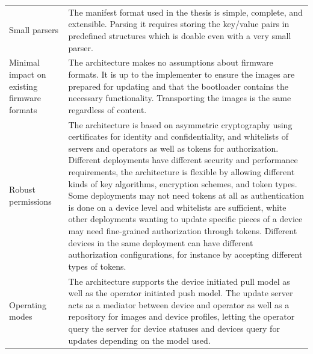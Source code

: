 \documentclass[0-thesis.tex]{subfiles}
\begin{document}
\begin{longtable}[]{@{}ll@{}}
\begin{minipage}[t]{0.41\columnwidth}
    Small parsers\strut
    \end{minipage} & \begin{minipage}[t]{0.53\columnwidth}\raggedright\strut
    The manifest format used in the thesis is simple, complete, and
    extensible. Parsing it requires storing the key/value pairs in
    predefined structures which is doable even with a very small
    parser.\strut
    \end{minipage}\tabularnewline
    \begin{minipage}[t]{0.41\columnwidth}\raggedright\strut
    Minimal impact on existing firmware formats\strut
    \end{minipage} & \begin{minipage}[t]{0.53\columnwidth}\raggedright\strut
    The architecture makes no assumptions about firmware formats. It is up
    to the implementer to ensure the images are prepared for updating and
    that the bootloader contains the necessary functionality. Transporting
    the images is the same regardless of content.\strut
    \end{minipage}\tabularnewline
    \begin{minipage}[t]{0.41\columnwidth}\raggedright\strut
    Robust permissions\strut
    \end{minipage} & \begin{minipage}[t]{0.53\columnwidth}\raggedright\strut
    The architecture is based on asymmetric cryptography using certificates
    for identity and confidentiality, and whitelists of servers and
    operators as well as tokens for authorization. Different deployments
    have different security and performance requirements, the architecture
    is flexible by allowing different kinds of key algorithms, encryption
    schemes, and token types. Some deployments may not need tokens at all as
    authentication is done on a device level and whitelists are sufficient,
    white other deployments wanting to update specific pieces of a device
    may need fine-grained authorization through tokens. Different devices in
    the same deployment can have different authorization configurations, for
    instance by accepting different types of tokens.\strut
    \end{minipage}\tabularnewline
    \begin{minipage}[t]{0.41\columnwidth}\raggedright\strut
    Operating modes\strut
    \end{minipage} & \begin{minipage}[t]{0.53\columnwidth}\raggedright\strut
    The architecture supports the device initiated pull model as well as the
    operator initiated push model. The update server acts as a mediator
    between device and operator as well as a repository for images and
    device profiles, letting the operator query the server for device
    statuses and devices query for updates depending on the model
    used.\strut
    \end{minipage}\tabularnewline
    \bottomrule
\end{longtable}
  
\end{document}
